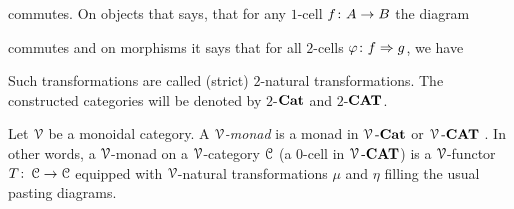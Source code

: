 \documentclass[a4paper,11pt,oneside,openany]{scrbook}
\begin{document}
\begin{exmp}
\begin{center}
	\end{center}
	commutes. On objects that says, that for any $1$-cell $f \colon A \to B$ the diagram
	\begin{center}
	\end{center}
	commutes and on morphisms it says that for all $2$-cells $\varphi \colon f \Rightarrow g$, we have
	\begin{center}
	\end{center}
	Such transformations are called (strict) $2$-natural transformations. The constructed categories will be denoted by $2$-${\normalfont\textbf{Cat}}$ and $2$-${\normalfont\textbf{CAT}}$.
\end{exmp}

\begin{defn}
	Let $\operatorname{\mathcal{V}}$ be a monoidal category. A $\operatorname{\mathcal{V}}$\emph{-monad} is a monad in $\operatorname{\mathcal{V}}\mbox{-}{\normalfont\textbf{Cat}}$ or $\operatorname{\mathcal{V}}\mbox{-}{\normalfont\textbf{CAT}}$%
	. In other words, a $\operatorname{\mathcal{V}}$-monad on a $\operatorname{\mathcal{V}}$-category $\operatorname{\mathcal{C}}$ (a $0$-cell in $\operatorname{\mathcal{V}}\mbox{-}{\normalfont\textbf{CAT}}$) is a $\operatorname{\mathcal{V}}$-functor $T\colon\operatorname{\mathcal{C}}\to\operatorname{\mathcal{C}}$ equipped with $\operatorname{\mathcal{V}}$-natural transformations $\mu$ and $\eta$ filling the usual pasting diagrams.
\end{defn}
\end{document}
